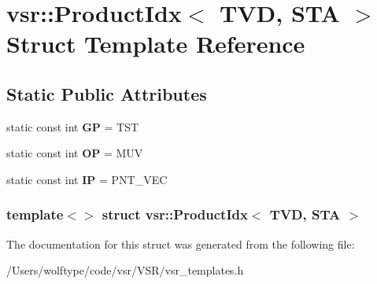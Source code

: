 \hypertarget{structvsr_1_1_product_idx_3_01_t_v_d_00_01_s_t_a_01_4}{\section{vsr\-:\-:Product\-Idx$<$ T\-V\-D, S\-T\-A $>$ Struct Template Reference}
\label{structvsr_1_1_product_idx_3_01_t_v_d_00_01_s_t_a_01_4}
}
\subsection*{Static Public Attributes}
\begin{DoxyCompactItemize}
\item 
\hypertarget{structvsr_1_1_product_idx_3_01_t_v_d_00_01_s_t_a_01_4_a939248f5cc5030f981d2e9562f44f15b}{static const int {\bfseries G\-P} = T\-S\-T}\label{structvsr_1_1_product_idx_3_01_t_v_d_00_01_s_t_a_01_4_a939248f5cc5030f981d2e9562f44f15b}

\item 
\hypertarget{structvsr_1_1_product_idx_3_01_t_v_d_00_01_s_t_a_01_4_a8a77e7a72f423833e22df63c1d2b9725}{static const int {\bfseries O\-P} = M\-U\-V}\label{structvsr_1_1_product_idx_3_01_t_v_d_00_01_s_t_a_01_4_a8a77e7a72f423833e22df63c1d2b9725}

\item 
\hypertarget{structvsr_1_1_product_idx_3_01_t_v_d_00_01_s_t_a_01_4_a347a52839c0e43beb60e44e860b42001}{static const int {\bfseries I\-P} = P\-N\-T\-\_\-\-V\-E\-C}\label{structvsr_1_1_product_idx_3_01_t_v_d_00_01_s_t_a_01_4_a347a52839c0e43beb60e44e860b42001}

\end{DoxyCompactItemize}
\subsubsection*{template$<$$>$ struct vsr\-::\-Product\-Idx$<$ T\-V\-D, S\-T\-A $>$}



The documentation for this struct was generated from the following file\-:\begin{DoxyCompactItemize}
\item 
/\-Users/wolftype/code/vsr/\-V\-S\-R/vsr\-\_\-templates.\-h\end{DoxyCompactItemize}
